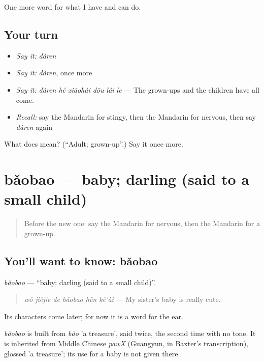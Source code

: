 \begin{grammarlens}[title={What you've built}]
One more word for what I have and can do.
\end{grammarlens}

\subsection*{Your turn}
\begin{itemize}
\raggedright
  \item \emph{Say it:} \emph{dàren}
  \item \emph{Say it:} \emph{dàren}, once more
  \item \emph{Say it:} \emph{dàren hé xiǎohái dōu lái le} — The grown-ups and the children have all come.
  \item \emph{Recall:} say the Mandarin for stingy, then the Mandarin for nervous, then say \emph{dàren} again
\end{itemize}

\begin{tcolorbox}[breakable,colback=teal!4,colframe=teal!35!black,title={Before you move on}]
What does  mean? (\textquotedblleft{}Adult; grown-up\textquotedblright{}.) Say it once more.
\end{tcolorbox}
\section[bǎobao]{bǎobao — baby; darling (said to a small child)}

\label{lesson:ZH-C266-baobao}



\begin{quote}
Before the new one: say the Mandarin for nervous, then the Mandarin for a grown-up.
\end{quote}

\subsection*{You'll want to know: bǎobao}
\emph{bǎobao} — \textquotedblleft{}baby; darling (said to a small child)\textquotedblright{}.

\begin{quote}
\emph{wǒ jiějie de bǎobao hěn kě'ài} — My sister's baby is really cute.
\end{quote}

Its characters come later; for now it is a word for the ear.

\begin{cousinweb}
\emph{bǎobao} is built from \emph{bǎo} 'a treasure', said twice, the second time with no tone. It is inherited from Middle Chinese \emph{pawX} (Guangyun, in Baxter's transcription), glossed 'a treasure'; its use for a baby is not given there.
\end{cousinweb}

